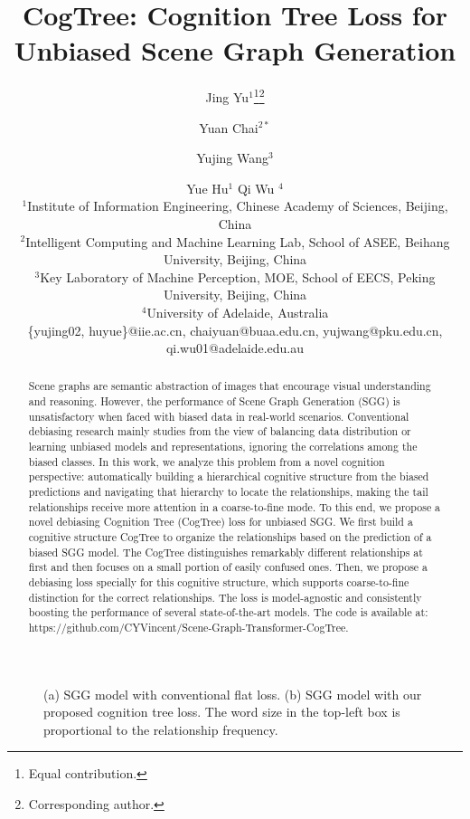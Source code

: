 \documentclass{article}
\title{CogTree: Cognition Tree Loss for Unbiased Scene Graph Generation}
\author{
Jing Yu$^{1}$\footnote{Equal contribution.}\footnote{Corresponding author.}\and
Yuan Chai$^{2*}$\and
Yujing Wang$^{3}$\and
Yue Hu$^{1}$\And
Qi Wu $^{4}$\\
\affiliations
$^1$Institute of Information Engineering, Chinese Academy of Sciences, Beijing, China\\
$^2$Intelligent Computing and Machine Learning Lab, School of ASEE, Beihang University, Beijing, China \\
$^3$Key Laboratory of Machine Perception, MOE, School of EECS, Peking University, Beijing, China\\
$^4$University of Adelaide, Australia\\
\emails
\{yujing02, huyue\}@iie.ac.cn,
chaiyuan@buaa.edu.cn,
yujwang@pku.edu.cn,
qi.wu01@adelaide.edu.au
}
\begin{document}
\maketitle
\begin{abstract}

Scene graphs are semantic abstraction of images that encourage visual understanding and reasoning. However, the performance of Scene Graph Generation (SGG) is unsatisfactory when faced with biased data in real-world scenarios. Conventional debiasing research mainly studies from the view of  balancing data distribution or learning unbiased models and representations, ignoring the correlations among the biased classes. In this work, we analyze this problem from a novel cognition perspective: automatically building a hierarchical cognitive structure from the biased predictions and navigating that hierarchy to locate the relationships, making the tail relationships receive more attention in a coarse-to-fine mode. To this end, we propose a novel debiasing Cognition Tree (CogTree) loss for unbiased SGG. We first build a cognitive structure CogTree to organize the relationships based on the prediction of a biased SGG model. The CogTree distinguishes remarkably different relationships at first and then focuses on a small  portion  of  easily  confused  ones. Then, we propose a 
debiasing loss specially for this cognitive structure, which supports coarse-to-fine distinction for the correct relationships. The loss is model-agnostic and  consistently boosting the performance of several state-of-the-art models.  The code is available at: https://github.com/CYVincent/Scene-Graph-Transformer-CogTree.
\end{abstract}


\begin{figure}[t]
    \centering
    \caption{(a) SGG model with conventional flat loss. (b) SGG model with our proposed cognition tree loss. The word size in the top-left box is proportional to the relationship frequency.}
    \label{fig:comparison}
\end{figure}
\end{document}
